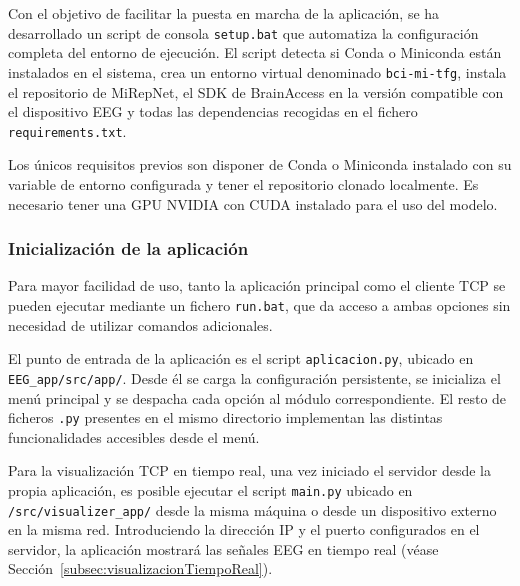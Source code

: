 Con el objetivo de facilitar la puesta en marcha de la aplicación, se ha desarrollado un script de consola \texttt{setup.bat} que automatiza la configuración completa del entorno de ejecución. El script detecta si Conda o Miniconda están instalados en el sistema, crea un entorno virtual denominado \texttt{bci-mi-tfg}, instala el repositorio de MiRepNet, el SDK de BrainAccess en la versión compatible con el dispositivo EEG y todas las dependencias recogidas en el fichero \texttt{requirements.txt}.

Los únicos requisitos previos son disponer de Conda o Miniconda instalado con su variable de entorno configurada y tener el repositorio clonado localmente. Es necesario tener una GPU NVIDIA con CUDA instalado para el uso del modelo. 

\subsubsection{Inicialización de la aplicación}
\label{subsubsec:inicializacion}
Para mayor facilidad de uso, tanto la aplicación principal como el cliente TCP se pueden ejecutar mediante un fichero \texttt{run.bat}, que da acceso a ambas opciones sin necesidad de utilizar comandos adicionales.

El punto de entrada de la aplicación es el script \texttt{aplicacion.py}, ubicado en \texttt{EEG\_app/src/app/}. Desde él se carga la configuración persistente, se inicializa el menú principal y se despacha cada opción al módulo correspondiente. El resto de ficheros \texttt{.py} presentes en el mismo directorio implementan las distintas funcionalidades accesibles desde el menú.

Para la visualización TCP en tiempo real, una vez iniciado el servidor desde la propia aplicación, es posible ejecutar el script \texttt{main.py} ubicado en \texttt{/src/visualizer\_app/} desde la misma máquina o desde un dispositivo externo en la misma red. Introduciendo la dirección IP y el puerto configurados en el servidor, la aplicación mostrará las señales EEG en tiempo real (véase Sección~\ref{subsec:visualizacionTiempoReal}).
